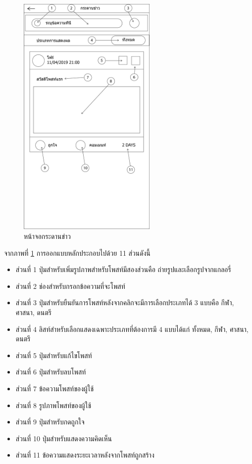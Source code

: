 		\begin{figure}[H]
			\centering
			\includegraphics[width=0.6\textwidth]{Figures/3/UI/board}
			\caption{หน้าจอกระดานข่าว}
			\label{Fig:กระดานข่าว}
		\end{figure}
		จากภาพที่ \ref{Fig:กระดานข่าว} การออกแบบหลักประกอบไปด้วย 11 ส่วนดังนี้
		\begin{itemize}
			\item ส่วนที่ 1 ปุ่มสำหรับเพิ่มรูปภาพสำหรับโพสท์มีสองส่วนคือ ถ่ายรูปและเลือกรูปจากแกลอรี่
			\item ส่วนที่ 2 ช่องสำหรับกรอกข้อความที่จะโพสท์
			\item ส่วนที่ 3 ปุ่มสำหรับยืนยันการโพสท์หลังจากคลิกจะมีการเลือกประเภทได้ 3 แบบคือ กีฬา, ศาสนา, ดนตรี
			\item ส่วนที่ 4 ลิสท์สำหรับเลือกแสดงเฉพาะประเภทที่ต้องการมี 4 แบบได้แก่ ทั้งหมด, กีฬา, ศาสนา, ดนตรี
			\item ส่วนที่ 5 ปุ่มสำหรับแก้ไขโพสท์
			\item ส่วนที่ 6 ปุ่มสำหรับลบโพสท์
			\item ส่วนที่ 7 ข้อความโพสท์ของผู้ใช้
			\item ส่วนที่ 8 รูปภาพโพสท์ของผู้ใช้
			\item ส่วนที่ 9 ปุ่มสำหรับกดถูกใจ
			\item ส่วนที่ 10 ปุ่มสำหรับแสดงความคิดเห็น
			\item ส่วนที่ 11 ข้อความแสดงระยะเวลาหลังจากโพสท์ถูกสร้าง
		\end{itemize}

